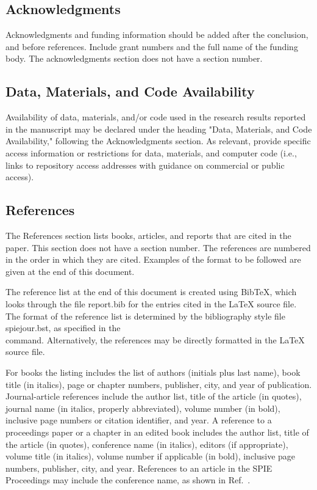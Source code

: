 \documentclass[12pt]{spieman}  %
\begin{document}
\begin{spacing}{2}
\subsection{Acknowledgments}
Acknowledgments and funding information should be added after the conclusion, and before references. Include grant numbers and the full name of the funding body. The acknowledgments section does not have a section number.

\subsection{Data, Materials, and Code Availability}
Availability of data, materials, and/or code used in the research results reported in the manuscript may be declared under the heading "Data, Materials, and Code Availability," following the Acknowledgments section. As relevant, provide specific access information or restrictions for data, materials, and computer code (i.e., links to repository access addresses with guidance on commercial or public access).

\subsection{References}
The References section lists books, articles, and reports that are cited in the paper. This section does not have a section number. The references are numbered in the order in which they are cited. Examples of the format to be followed are given at the end of this document.

The reference list at the end of this document is created using BibTeX, which looks through the file {\ttfamily report.bib} for the entries cited in the LaTeX source file.  The format of the reference list is determined by the bibliography style file {\ttfamily spiejour.bst}, as specified in the \\ \verb|| command.  Alternatively, the references may be directly formatted in the LaTeX source file.

For books\cite{Lamport94,Alred03,Goossens97} the listing includes the list of authors (initials plus last name), book title (in italics), page or chapter numbers, publisher, city, and year of publication.  Journal-article references \cite{Metropolis53,Harris06} include the author list, title of the article (in quotes), journal name (in italics, properly abbreviated), volume number (in bold), inclusive page numbers or citation identifier, and year.  A reference to a proceedings paper or a chapter in an edited book\cite{Gull89a} includes the author list, title of the article (in quotes), conference name (in italics), editors (if appropriate), volume title (in italics), volume number if applicable (in bold), inclusive page numbers, publisher, city, and year.  References to an article in the SPIE Proceedings may include the conference name, as shown in Ref.~.


\end{spacing}
\end{document}
